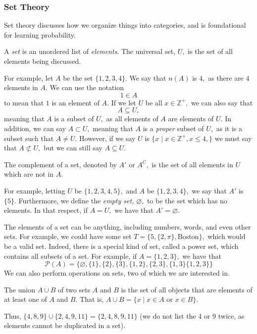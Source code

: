 \documentclass[11pt]{article}
\begin{document}
\subsubsection*{Set Theory}
Set theory discusses how we organize things into categories, and is foundational for learning probability.

\begin{defn}
	A \textit{set} is an unordered list of \textit{elements}. The universal set, $U,$ is the set of all elements being discussed.
\end{defn}
For example, let $A$ be the set $\{1,2,3,4\}.$ We say that $n(A)$ is $4,$ as there are $4$ elements in $A$. We can use the notation
\[1 \in A\]
to mean that $1$ is an element of $A$. If we let $U$ be all $x \in \mathbb{Z}^{+},$ we can also say that
\[A \subseteq U,\]
meaning that $A$ is a subset of $U,$ as all elements of $A$ are elements of $U$. In addition, we can say $A \subset U,$ meaning that $A$ is a \textit{proper} subset of $U,$ as it is a subset such that $A \neq U$. However, if we say $U$ is $\{x \mid x \in \mathbb{Z}^{+}, x \leq 4,\}$ we must say that $A \not\subset U,$ but we can still say $A \subseteq U.$
\begin{defn}
	The complement of a set, denoted by $A'$ or $A^{C},$ is the set of all elements in $U$ which are not in $A.$
\end{defn}
For example, letting $U$ be $\{1, 2, 3, 4, 5\},$ and $A$ be $\{1,2,3,4\},$ we say that $A'$ is $\{5\}.$ Furthermore, we define the \textit{empty set,} $\varnothing,$ to be the set which has no elements. In that respect, if $A = U,$ we have that $A' = \varnothing.$

The elements of a set can be anything, including numbers, words, and even other sets. For example, we could have some set $T = \{5, \{2,\pi\}, \text{Boston}\},$ which would be a valid set. Indeed, there is a special kind of set, called a power set, which contains all subsets of a set. For example, if $A = \{1, 2, 3\},$ we have that
\[\mathscr{P}(A) = \{\varnothing, \{1\}, \{2\}, \{3\}, \{1,2\}, \{2,3\}, \{1,3\} \{1,2,3\}\}\]
We can also perform operations on sets, two of which we are interested in.
\begin{defn}
	The union $A \cup B$ of two sets $A$ and $B$ is the set of all objects that are elements of at least one of $A$ and $B$. That is, $A \cup B = \{x \mid x \in A \text{ or } x \in B\}.$
\end{defn}
Thus, $\{4,8,9\} \cup \{2,4,9,11\} = \{2,4,8,9,11\}$ (we do not list the 4 or 9 twice, as elements cannot be duplicated in a set).
\end{document}
